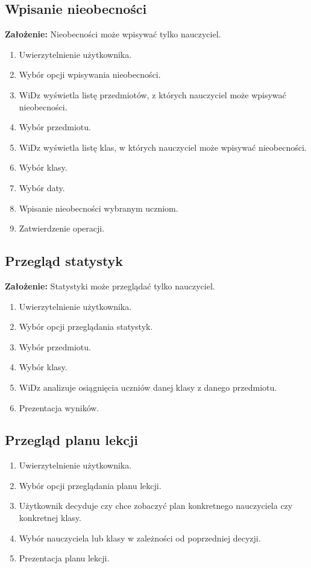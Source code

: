 \documentclass[12pt,leqno,twoside]{mwart}
\begin{document}
\subsection{Wpisanie nieobecności}
\noindent  \textbf{Założenie:} Nieobecności może wpisywać tylko nauczyciel.\\
\begin{enumerate}
\item Uwierzytelnienie użytkownika.
\item Wybór opcji wpisywania nieobecności.
\item WiDz wyświetla listę przedmiotów, z których nauczyciel może wpisywać nieobecności.
\item Wybór przedmiotu.
\item WiDz wyświetla listę klas, w których nauczyciel może wpisywać nieobecności.
\item Wybór klasy.
\item Wybór daty.
\item Wpisanie nieobecności wybranym uczniom.
\item Zatwierdzenie operacji.
\end{enumerate}
\subsection{Przegląd statystyk}
\noindent \textbf{Założenie:} Statystyki może przeglądać tylko nauczyciel.\\
\begin{enumerate}
\item Uwierzytelnienie użytkownika.
\item Wybór opcji przeglądania statystyk.
\item Wybór przedmiotu.
\item Wybór klasy.
\item WiDz analizuje osiągnięcia uczniów danej klasy z danego przedmiotu.
\item Prezentacja wyników.
\end{enumerate}
\subsection{Przegląd planu lekcji}
\begin{enumerate}
\item Uwierzytelnienie użytkownika.
\item Wybór opcji przeglądania planu lekcji.
\item Użytkownik decyduje czy chce zobaczyć plan konkretnego nauczyciela czy konkretnej klasy.
\item Wybór nauczyciela lub klasy w zależności od poprzedniej decyzji.
\item Prezentacja planu lekcji.
\end{enumerate}
\end{document}
